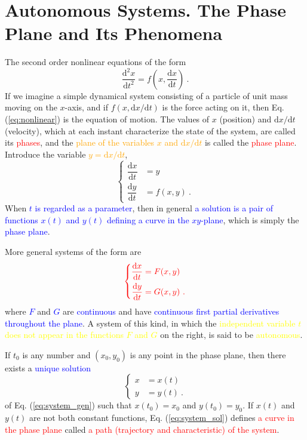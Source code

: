 \documentclass[12pt,a4paper]{article}
\newcommand{\dif}{\mathrm{d}}
\begin{document}
\section{Autonomous Systems. The Phase Plane and Its Phenomena}
\cite{george1991differential, simmons2016differential} The second order nonlinear equations of the form
\begin{equation}
\dfrac{\dif^2 x}{\dif t^2} = f\left(x, \dfrac{\dif x}{\dif t} \right) ~.
\label{eq:nonlinear}
\end{equation}
If we imagine a simple dynamical system consisting of a particle of unit mass moving on the $x$-axis, and if $f(x, \dif x/\dif t)$ is the force acting on it, then Eq. (\ref{eq:nonlinear}) is the equation of motion. The values of $x$ (position) and $\dif x/\dif t$ (velocity), which at each instant characterize the state of the system, are called its \textcolor{red}{phases}, and the \textcolor{orange}{plane of the variables $x$ and $\dif x/\dif t$} is called the \textcolor{red}{phase plane}. Introduce the variable \textcolor{orange}{$y = \dif x/\dif t$},
\begin{equation}
\left\{
\begin{aligned}
\dfrac{\dif x}{\dif t} & =  y \\
\dfrac{\dif y}{\dif t} & =  f(x, y) ~.
\end{aligned}
\label{eq:system}
\right.
\end{equation}
When \textcolor{blue}{$t$ is regarded as a parameter}, then in general \textcolor{blue}{a solution is a pair of functions $x(t)$ and $y(t)$ defining a curve in the $xy$-plane}, which is simply the \textcolor{blue}{phase plane}.

More general systems of the form are
\begin{equation}
\color{red}
\left\{
\begin{aligned}
\dfrac{\dif x}{\dif t} & =  F(x,y) \\
\dfrac{\dif y}{\dif t} & =  G(x, y) ~.
\label{eq:system_gen}
\end{aligned}
\right.
\end{equation}
where \textcolor{blue}{$F$} and \textcolor{blue}{$G$} are \textcolor{blue}{continuous} and have \textcolor{blue}{continuous first partial derivatives throughout the plane}. A system of this kind, in which the \textcolor{yellow}{independent variable $t$ does not appear in the functions $F$ and $G$} on the right, is said to be \textcolor{yellow}{autonomous}.

If $t_0$ is any number and $(x_0,y_0)$ is any point in the phase plane, then there exists a \textcolor{blue}{unique solution}
\begin{equation}
\left\{
\begin{aligned}
x & = x(t) \\
y & =  y(t) ~.
\label{eq:system_sol}
\end{aligned}
\right.
\end{equation}
of Eq. (\ref{eq:system_gen}) such that $x(t_0) = x_0$ and $y(t_0) = y_0$. If $x(t)$ and $y(t)$ are not both constant functions, Eq. (\ref{eq:system_sol}) defines \textcolor{red}{a curve in the phase plane} called \textcolor{red}{a path (trajectory and characteristic) of the system}.
\end{document}
